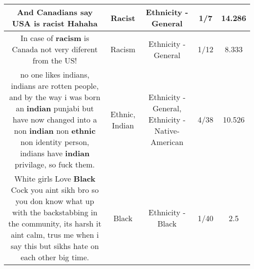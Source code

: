 \documentclass[11pt]{article}
\newlength\mylength
\begin{document}
\begin{center}
\begin{longtable}{|C{.65\mylength}|C{.30\mylength}|C{.12\mylength}|C{.12\mylength}|C{.12\mylength}|}
  \small And Canadians say USA is \textbf{racist} Hahaha\normalsize   & Racist & Ethnicity - General & 1/7 & 14.286 \\  \hline
  \small In case of \textbf{racism} is Canada not very diferent from the US!\normalsize   & Racism & Ethnicity - General & 1/12 & 8.333 \\  \hline
  \small no one likes indians, indians are rotten people, and by the way i was born an \textbf{indian} punjabi but have now changed into a non \textbf{indian} non \textbf{ethnic} non identity person, indians have \textbf{indian} privilage, so fuck them.\normalsize   & Ethnic, Indian & Ethnicity - General, Ethnicity - Native-American & 4/38 & 10.526 \\  \hline
  \small White girls Love \textbf{Black} Cock you aint sikh bro so you don know what up with the backstabbing in the community, its harsh it aint calm, trus me when i say this but sikhs hate on each other big time.\normalsize   & Black & Ethnicity - Black & 1/40 & 2.5 \\  \hline

\end{longtable}
\end{center}
\end{document}

